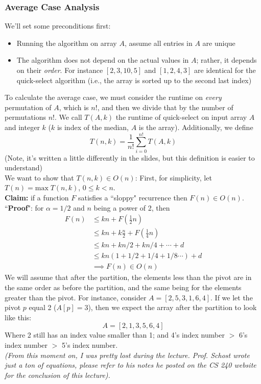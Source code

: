 \documentclass{report}
\begin{document}
\subsubsection{Average Case Analysis}
We'll set some preconditions first:
\begin{itemize}
\item Running the algorithm on array $A$, assume all entries in $A$ are unique
\item The algorithm does not depend on the actual values in $A$; rather, it depends on their \textit{order}. For instance $[2, 3, 10, 5]$ and $[1, 2, 4, 3]$ are identical for the quick-select algorithm (i.e., the array is sorted up to the second last index)
\end{itemize}
To calculate the average case, we must consider the runtime on \textit{every} permutation of $A$, which is $n!$, and then we divide that by the number of permutations $n!$.
We call $T(A, k)$ the runtime of quick-select on input array $A$ and integer $k$ ($k$ is index of the median, $A$ is the array). Additionally, we define $$T(n, k) = \frac{1}{n!}\sum_{i = 0}^{n!} T(A, k)$$
(Note, it's written a little differently in the slides, but this definition is easier to understand)\\
We want to show that $T(n, k) \in O(n)$:
First, for simplicity, let $T(n) = \mathrm{max}\;T(n, k)$, $0 \leq k < n$.\\
\textbf{Claim:} if a function $F$ satisfies a ``sloppy" recurrence
then $F(n) \in O(n)$.\\
``\textbf{Proof}": for $\alpha = 1/2$ and $n$ being a power of 2, then 
\begin{align*}
F(n) &\leq kn + F\left(\frac{1}{2}n\right) \\
&\leq kn + k\frac{n}{2} + F\left(\frac{1}{4}n\right)\\
&\leq kn + k n/2 + k n/4 + \cdots + d \\
&\leq kn(1 + 1/2 + 1/4 + 1/8 \cdots) + d \\
&\implies F(n) \in O(n)
\end{align*}
We will assume that after the partition, the elements less than the pivot are in the same order as before the partition, and the same being for the elements greater than the pivot. For instance, consider $A = [2, 5, 3, 1, 6, 4]$. If we let the pivot $p$ equal 2 ($A[p] = 3$), then we expect the array after the partition to look like this:
$$A = [2, 1, 3, 5, 6, 4]$$
Where 2 still has an index value smaller than 1; and 4's index number $>$ 6's index number $>$ 5's index number. \\

\textit{(From this moment on, I was pretty lost during the lecture. Prof. Schost wrote just a ton of equations, please refer to his notes he posted on the CS 240 website for the conclusion of this lecture).
}

\end{document}

